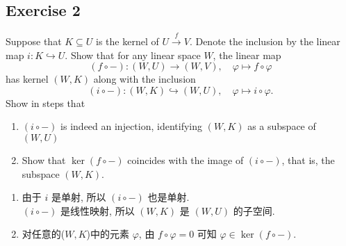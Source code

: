 \documentclass[11pt]{ctexart}
\theoremstyle{definition}
\numberwithin{equation}{section}
\theoremstyle{definition}
\theoremstyle{remark}
\begin{document}
\subsection{Exercise 2}
Suppose that $K \subseteq U$ is the kernel of $U \xrightarrow f V$. Denote the inclusion by the linear map $i : K \hookrightarrow U$. Show that for any linear space $W$, the linear map
$$
(f \circ -): (W,U) \to (W, V), \quad  \varphi \mapsto f \circ \varphi
$$
has kernel $(W, K)$ along with the inclusion
$$
(i \circ -): (W,K) \hookrightarrow (W, U), \quad  \varphi \mapsto i \circ \varphi.
$$
Show in steps that
\begin{enumerate}
    \item $(i \circ -)$ is indeed an injection, identifying $(W,K)$ as a subspace of $(W,U)$
    \item Show that $\ker (f \circ -)$ coincides with the image of $(i \circ -)$, that is, the subspace $(W,K)$.
\end{enumerate}
\begin{aaa}
    \begin{enumerate}
    \item 由于 $i$ 是单射, 所以 $(i\circ -)$ 也是单射.\\$(i \circ -)$ 是线性映射, 所以 $(W,K)$ 是 $(W,U)$ 的子空间.
    \item 对任意的($W,K$)中的元素 $\varphi$, 由 $f\circ \varphi=0$ 可知 $\varphi \in \ker (f\circ -)$.\\
    \end{enumerate}
\end{aaa}
\end{document}
